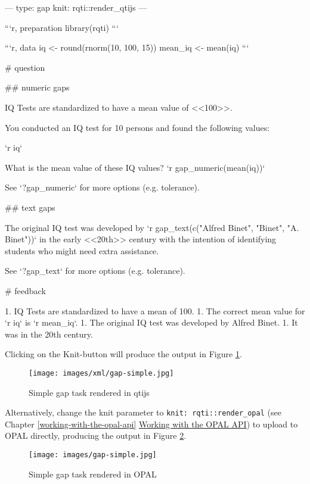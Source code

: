 \documentclass[twoside]{tufte-book}
\newenvironment{Shaded}{}{}
\begin{document}
\begin{Shaded}
\begin{Highlighting}
---
type: gap
knit: rqti::render_qtijs
---

```{r, preparation}
library(rqti)
```

```{r, data}
iq <- round(rnorm(10, 100, 15))
mean_iq <- mean(iq)
```

# question

## numeric gaps

IQ Tests are standardized to have a mean value of <<100>>.

You conducted an IQ test for 10 persons and found the following values:

`r iq`

What is the mean value of these IQ values? `r gap_numeric(mean(iq))`

See `?gap_numeric` for more options (e.g. tolerance).

## text gaps

The original IQ test was developed by `r gap_text(c("Alfred Binet", "Binet", "A.
Binet"))` in the early <<20th>> century with the intention of identifying
students who might need extra assistance.

See `?gap_text` for more options (e.g. tolerance).

# feedback

1. IQ Tests are standardized to have a mean of 100.
1. The correct mean value for `r iq` is `r mean_iq`.
1. The original IQ test was developed by Alfred Binet.
1. It was in the 20th century.
\end{Highlighting}
\end{Shaded}

Clicking on the Knit-button will produce the output in Figure \ref{gap1qtijs}.

\begin{figure}
\centering
\texttt{[image: images/xml/gap-simple.jpg]}
\caption{\label{gap1qtijs}Simple gap task rendered in qtijs}
\end{figure}

\noindent Alternatively, change the knit parameter to \texttt{knit:\ rqti::render\_opal} (see Chapter \ref{working-with-the-opal-api} \href{api_opal.html}{Working with the OPAL API}) to upload to OPAL directly, producing the output in Figure \ref{gap1opal}.

\begin{figure}
\centering
\texttt{[image: images/gap-simple.jpg]}
\caption{\label{gap1opal}Simple gap task rendered in OPAL}
\end{figure}
\end{document}
